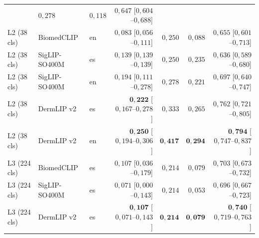 \begin{table}[H]
\begin{tabular}{lllrrrr}
                                  & $0{,}278$
                                  & $0{,}118$
                                  & $0{,}647$ [$0{,}604$--$0{,}688$] \\
L2 (38 cls)  & BiomedCLIP    & en & $0{,}083$ [$0{,}056$--$0{,}111$]
                                  & $0{,}250$
                                  & $0{,}088$
                                  & $0{,}655$ [$0{,}601$--$0{,}713$] \\
L2 (38 cls)  & SigLIP-SO400M & es & $0{,}139$ [$0{,}139$--$0{,}139$]
                                  & $0{,}250$
                                  & $0{,}235$
                                  & $0{,}636$ [$0{,}589$--$0{,}680$] \\
L2 (38 cls)  & SigLIP-SO400M & en & $0{,}194$ [$0{,}111$--$0{,}278$]
                                  & $0{,}278$
                                  & $0{,}221$
                                  & $0{,}697$ [$0{,}640$--$0{,}747$] \\
L2 (38 cls)  & DermLIP v2    & es & $\mathbf{0{,}222}$ [$0{,}167$--$0{,}278$]
                                  & $0{,}333$
                                  & $0{,}265$
                                  & $0{,}762$ [$0{,}721$--$0{,}805$] \\
L2 (38 cls)  & DermLIP v2    & en & $\mathbf{0{,}250}$ [$0{,}194$--$0{,}306$]
                                  & $\mathbf{0{,}417}$
                                  & $\mathbf{0{,}294}$
                                  & $\mathbf{0{,}794}$ [$0{,}747$--$0{,}837$] \\
\hline
L3 (224 cls) & BiomedCLIP    & es & $0{,}107$ [$0{,}036$--$0{,}179$]
                                  & $0{,}214$
                                  & $0{,}079$
                                  & $0{,}703$ [$0{,}673$--$0{,}732$] \\
L3 (224 cls) & SigLIP-SO400M & es & $0{,}071$ [$0{,}000$--$0{,}143$]
                                  & $0{,}214$
                                  & $0{,}053$
                                  & $0{,}696$ [$0{,}667$--$0{,}723$] \\
L3 (224 cls) & DermLIP v2    & es & $\mathbf{0{,}107}$ [$0{,}071$--$0{,}143$]
                                  & $\mathbf{0{,}214}$
                                  & $\mathbf{0{,}079}$
                                  & $\mathbf{0{,}740}$ [$0{,}719$--$0{,}763$] \\
\hline
\end{tabular}
\end{table}

